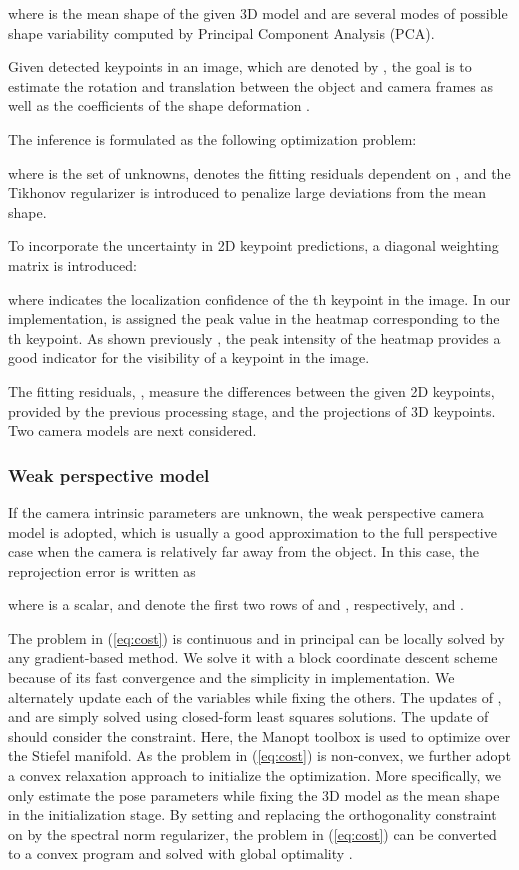 \documentclass[letterpaper, 10 pt, conference]{ieeeconf}
\newcommand{\refEq}[1]{(\ref{#1})}
\begin{document}
where  is the mean shape of the given 3D model and  are several modes of possible shape variability computed by Principal Component Analysis (PCA).

Given detected keypoints in an image, which are denoted by , the goal is to estimate the rotation  and translation  between the object  and camera frames as well as the coefficients of the shape deformation . 

The inference is formulated as the following optimization problem:

where  is the set of unknowns,  denotes the fitting residuals dependent on , 
and the Tikhonov regularizer  is introduced to penalize large deviations from the mean shape. 

To incorporate the uncertainty in 2D keypoint predictions, a diagonal weighting matrix  is introduced:

where  indicates the localization confidence of the th keypoint in the image. In our implementation,  is assigned the peak value in the heatmap corresponding to the th keypoint. As shown previously \cite{newell2016stacked}, the peak intensity of the heatmap provides a good indicator for the visibility of a keypoint in the image.

The fitting residuals, , measure the differences between the given 2D keypoints, provided by the previous processing stage, and the projections of 3D keypoints. Two camera models are next considered.

\subsubsection{Weak perspective model}

If the camera intrinsic parameters are unknown, the weak perspective camera model is adopted, which is usually a good approximation to the full perspective case when the camera is relatively far away from the object. In this case, the reprojection error is written as 

where  is a scalar,  and  denote the first two rows of  and , respectively, and .

The problem in \refEq{eq:cost} is continuous and in principal can be locally solved by any gradient-based method. We solve it with a block coordinate descent scheme because of its fast convergence and the simplicity in implementation. We alternately update each of the variables while fixing the others. The updates of ,  and  are simply solved using closed-form least squares solutions. The update of  should consider the  constraint. Here, the Manopt toolbox \cite{boumal2014manopt} is used to optimize  over the Stiefel manifold. As the problem in \refEq{eq:cost} is non-convex, we further adopt a convex relaxation approach \cite{zhou20153d} to initialize the optimization. More specifically, we only estimate the pose parameters while fixing the 3D model as the mean shape in the initialization stage. By setting  and replacing the orthogonality constraint on  by the spectral norm regularizer, the problem in \refEq{eq:cost} can be converted to a convex program and solved with global optimality \cite{zhou20153d}.
\end{document}
